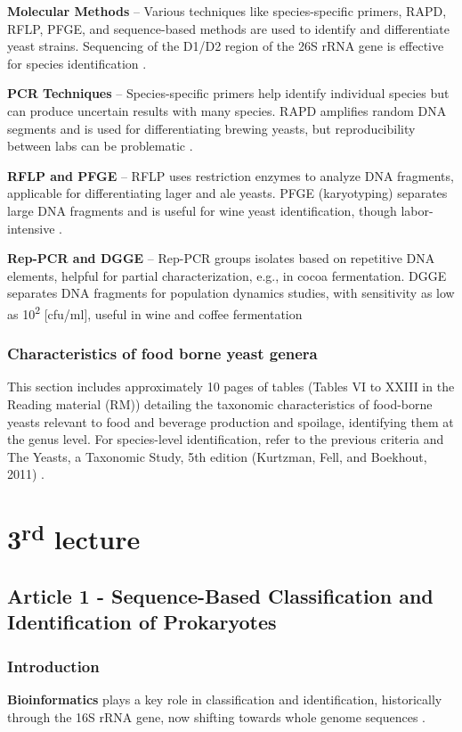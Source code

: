 \textbf{Molecular Methods} – Various techniques like species-specific primers, RAPD, RFLP, PFGE, and sequence-based methods are used to identify and differentiate yeast strains. Sequencing of the D1/D2 region of the 26S rRNA gene is effective for species identification \cite*{L2-YeastClass}.

\textbf{PCR Techniques} – Species-specific primers help identify individual species but can produce uncertain results with many species. RAPD amplifies random DNA segments and is used for differentiating brewing yeasts, but reproducibility between labs can be problematic \cite*{L2-YeastClass}.

\textbf{RFLP and PFGE} – RFLP uses restriction enzymes to analyze DNA fragments, applicable for differentiating lager and ale yeasts. PFGE (karyotyping) separates large DNA fragments and is useful for wine yeast identification, though labor-intensive \cite*{L2-YeastClass}.

\textbf{Rep-PCR and DGGE} – Rep-PCR groups isolates based on repetitive DNA elements, helpful for partial characterization, e.g., in cocoa fermentation. DGGE separates DNA fragments for population dynamics studies, with sensitivity as low as 10\textsuperscript{2} [cfu/ml], useful in wine and coffee fermentation \cite*{L2-YeastClass}

\subsubsection*{Characteristics of food borne yeast genera}
This section includes approximately 10 pages of tables (Tables VI to XXIII in the Reading material (RM)) detailing the taxonomic characteristics of food-borne yeasts relevant to food and beverage production and spoilage, identifying them at the genus level. For species-level identification, refer to the previous criteria and The Yeasts, a Taxonomic Study, 5th edition (Kurtzman, Fell, and Boekhout, 2011) \cite*{L2-YeastClass}.

\section{3\texorpdfstring{\textsuperscript{rd}}{rd} lecture}
\subsection{Article 1 - Sequence-Based Classification and Identification of Prokaryotes}
\subsubsection*{Introduction}
\textbf{Bioinformatics} plays a key role in classification and identification, historically through the 16S rRNA gene, now shifting towards whole genome sequences \cite*{L3-SeqBasedClass}.

